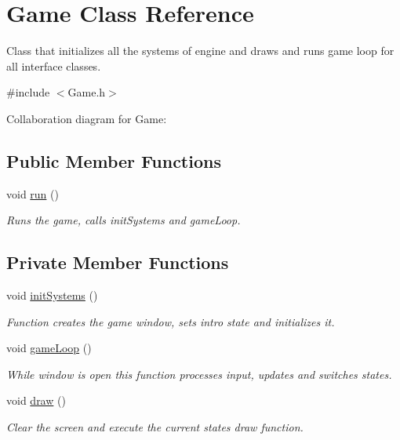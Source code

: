 \hypertarget{classGame}{}\section{Game Class Reference}
\label{classGame}


Class that initializes all the systems of engine and draws and runs game loop for all interface classes.  




{\ttfamily \#include $<$Game.\+h$>$}



Collaboration diagram for Game\+:
\subsection*{Public Member Functions}
\begin{DoxyCompactItemize}
\item 
void \hyperlink{classGame_a1ab78f5ed0d5ea879157357cf2fb2afa}{run} ()\hypertarget{classGame_a1ab78f5ed0d5ea879157357cf2fb2afa}{}\label{classGame_a1ab78f5ed0d5ea879157357cf2fb2afa}

\begin{DoxyCompactList}\small\item\em Runs the game, calls init\+Systems and game\+Loop. \end{DoxyCompactList}\end{DoxyCompactItemize}
\subsection*{Private Member Functions}
\begin{DoxyCompactItemize}
\item 
void \hyperlink{classGame_a4026fce1d5c3f8cba3d32b1d0eee486f}{init\+Systems} ()\hypertarget{classGame_a4026fce1d5c3f8cba3d32b1d0eee486f}{}\label{classGame_a4026fce1d5c3f8cba3d32b1d0eee486f}

\begin{DoxyCompactList}\small\item\em Function creates the game window, sets intro state and initializes it. \end{DoxyCompactList}\item 
void \hyperlink{classGame_aede5f46c8c7bbbaf8459eeec397a11e7}{game\+Loop} ()\hypertarget{classGame_aede5f46c8c7bbbaf8459eeec397a11e7}{}\label{classGame_aede5f46c8c7bbbaf8459eeec397a11e7}

\begin{DoxyCompactList}\small\item\em While window is open this function processes input, updates and switches states. \end{DoxyCompactList}\item 
void \hyperlink{classGame_a6d54497ce3a66f6dd45eacfdccc8d0bd}{draw} ()\hypertarget{classGame_a6d54497ce3a66f6dd45eacfdccc8d0bd}{}\label{classGame_a6d54497ce3a66f6dd45eacfdccc8d0bd}

\begin{DoxyCompactList}\small\item\em Clear the screen and execute the current states draw function. \end{DoxyCompactList}\end{DoxyCompactItemize}
